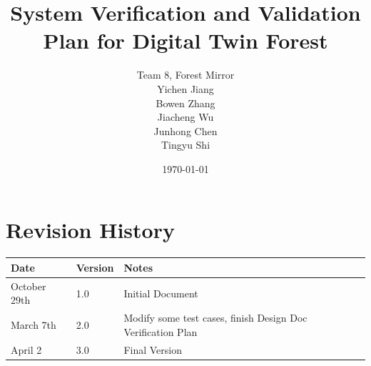 \documentclass[12pt, titlepage]{article}
\begin{document}
\title{System Verification and Validation Plan for Digital Twin Forest} 
\author{Team 8, Forest Mirror\\Yichen Jiang\\ Bowen Zhang\\ Jiacheng Wu\\ Junhong Chen\\ Tingyu Shi}
\date{\today}
	
\maketitle


\section{Revision History}

\begin{tabularx}{\textwidth}{p{3cm}p{2cm}X}
\toprule {\bf Date} & {\bf Version} & {\bf Notes}\\
\midrule
October 29th & 1.0 & Initial Document\\
\hline
March 7th & 2.0 & Modify some test cases, finish Design Doc Verification
Plan\\
\hline
April 2 & 3.0 & Final Version\\
\bottomrule
\end{tabularx}

\newpage

\tableofcontents
\listoftables
\listoffigures

\newpage
\end{document}
